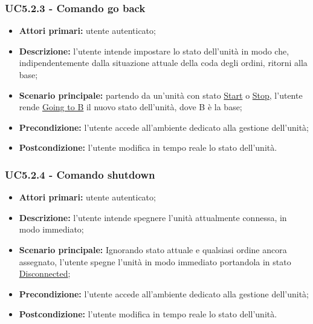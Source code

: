         \subsubsection{UC5.2.3 - Comando go back}
        \begin{itemize}
            \item \textbf{Attori primari:} utente autenticato;
            \item \textbf{Descrizione:} l'utente intende impostare lo stato dell'unità in modo che, indipendentemente dalla situazione attuale della coda degli ordini, ritorni alla base;
            \item \textbf{Scenario principale:} partendo da un'unità con stato \underline{Start} o \underline{Stop}, l'utente rende \underline{Going to B} il nuovo stato dell'unità, dove B è la base;
            \item \textbf{Precondizione:} l'utente accede all'ambiente dedicato alla gestione dell'unità;
            \item \textbf{Postcondizione:} l'utente modifica in tempo reale lo stato dell'unità.
        \end{itemize}

        \subsubsection{UC5.2.4 - Comando shutdown}
        \begin{itemize}
            \item \textbf{Attori primari:} utente autenticato;
            \item \textbf{Descrizione:} l'utente intende spegnere l'unità attualmente connessa, in modo immediato;
            \item \textbf{Scenario principale:} Ignorando stato attuale e qualsiasi ordine ancora assegnato, l'utente spegne l'unità in modo immediato portandola in stato \underline{Disconnected};
            \item \textbf{Precondizione:} l'utente accede all'ambiente dedicato alla gestione dell'unità;
            \item \textbf{Postcondizione:} l'utente modifica in tempo reale lo stato dell'unità.
        \end{itemize}

